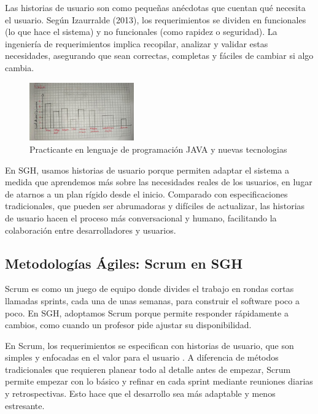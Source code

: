 Las historias de usuario son como pequeñas anécdotas que cuentan qué necesita el usuario. Según Izaurralde (2013), los requerimientos se dividen en funcionales (lo que hace el sistema) y no funcionales (como rapidez o seguridad). La ingeniería de requerimientos implica recopilar, analizar y validar estas necesidades, asegurando que sean correctas, completas y fáciles de cambiar si algo cambia.

\begin{figure}[h]
    \centering
    \includegraphics[width=0.4\textwidth]{graphics/practica de lenguaje de programacion java y nuevas tecnologias.png}
    \caption{Practicante en lenguaje de programación JAVA y nuevas tecnologias}
    \label{fig:java}
\end{figure}

En SGH, usamos historias de usuario porque permiten adaptar el sistema a medida que aprendemos más sobre las necesidades reales de los usuarios, en lugar de atarnos a un plan rígido desde el inicio. Comparado con especificaciones tradicionales, que pueden ser abrumadoras y difíciles de actualizar, las historias de usuario hacen el proceso más conversacional y humano, facilitando la colaboración entre desarrolladores y usuarios.

\subsection{Metodologías Ágiles: Scrum en SGH}
Scrum es como un juego de equipo donde divides el trabajo en rondas cortas llamadas sprints, cada una de unas semanas, para construir el software poco a poco. En SGH, adoptamos Scrum porque permite responder rápidamente a cambios, como cuando un profesor pide ajustar su disponibilidad.

En Scrum, los requerimientos se especifican con historias de usuario, que son simples y enfocadas en el valor para el usuario \cite{izaurralde2013}. A diferencia de métodos tradicionales que requieren planear todo al detalle antes de empezar, Scrum permite empezar con lo básico y refinar en cada sprint mediante reuniones diarias y retrospectivas. Esto hace que el desarrollo sea más adaptable y menos estresante.


